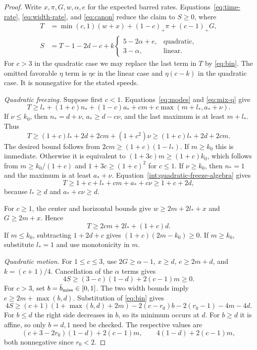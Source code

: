 \begin{proof}
Write $x,\pi,G,w,\alpha,e$ for the expected
barred rates. Equations~\eqref{eq:time-rate},
\eqref{eq:width-rate}, and \eqref{eq:canon}
reduce the claim to $S\geq0$, where
\begin{equation}\label{int:surplus-algebra}
 \begin{split}
 T&=\min(c,1)(w+x)+(1-c)_+\pi+(c-1)_+G,\\
 S&=T-1-2d-c+k
 \begin{cases}
 5-2\alpha+e,&\text{quadratic},\\
 3-\alpha,&\text{linear}.
 \end{cases}
 \end{split}
\end{equation}
For $c>3$ in the quadratic case we may
replace the last term in $T$ by
\eqref{eq:bin}. The omitted favorable
$\eta$ term is $\eta c$ in the linear
case and $\eta(c-k)$ in the quadratic
case. It is nonnegative for the stated
speeds.

\emph{Quadratic freezing.}
Suppose first $c<1$. Equations~\eqref{eq:modes}
and \eqref{eq:mix-q} give
\begin{equation}\label{int:quadratic-freeze-algebra}
 T\geq l_*+(1+c)n_*+(1-c)a_*+cm
                   +c\max(m+l_*,a_*+\nu).
\end{equation}
If $\nu\leq k_0$, then $n_*=d+\nu$,
$a_*\geq d-c\nu$, and the last maximum
is at least $m+l_*$. Thus
\[
 T\geq(1+c)l_*+2d+2cm+(1+c^2)\nu
       \geq(1+c)l_*+2d+2cm.
\]
The desired bound follows from
$2cm\geq(1+c)(1-l_*)$. If $m\geq k_0$
this is immediate. Otherwise it is
equivalent to $(1+3c)m\geq(1+c)k_0$,
which follows from $m\geq k_0/(1+c)$
and $1+3c\geq(1+c)^2$ for $c\leq1$.
If $\nu\geq k_0$, then $n_*=1$ and
the maximum is at least $a_*+\nu$.
Equation~\eqref{int:quadratic-freeze-algebra}
gives
\[
 T\geq1+c+l_*+cm+a_*+c\nu
       \geq1+c+2d,
\]
because $l_*\geq d$ and $a_*+c\nu\geq d$.

For $c\geq1$, the center and horizontal
bounds give $w\geq2m+2l_*+x$ and
$G\geq2m+x$. Hence
\[
 T\geq2cm+2l_*+(1+c)d.
\]
If $m\leq k_0$, subtracting $1+2d+c$
gives $(1+c)(2m-k_0)\geq0$.
If $m\geq k_0$, substitute $l_*=1$
and use monotonicity in $m$.

\emph{Quadratic motion.}
For $1\leq c\leq3$, use
$2G\geq\alpha-1$, $x\geq d$,
$e\geq2m+d$, and $k=(c+1)/4$.
Cancellation of the $\alpha$ terms gives
\[
 4S\geq(3-c)(1-d)+2(c-1)m\geq0.
\]
For $c>3$, set $b=\bar b_{\rm miss}\in[0,1]$.
The two width bounds imply
$e\geq2m+\max(b,d)$. Substitution of
\eqref{eq:bin} gives
\[
 4S\geq(c+1)(1+\max(b,d)+2m)
         -2(c-r_0)b-2(r_0-1)-4m-4d.
\]
For $b\leq d$ the right side decreases
in $b$, so its minimum occurs at $d$.
For $b\geq d$ it is affine, so only
$b=d,1$ need be checked. The respective
values are
\[
 (c+3-2r_0)(1-d)+2(c-1)m,
 \qquad 4(1-d)+2(c-1)m,
\]
both nonnegative since $r_0<2$.


\end{proof}
